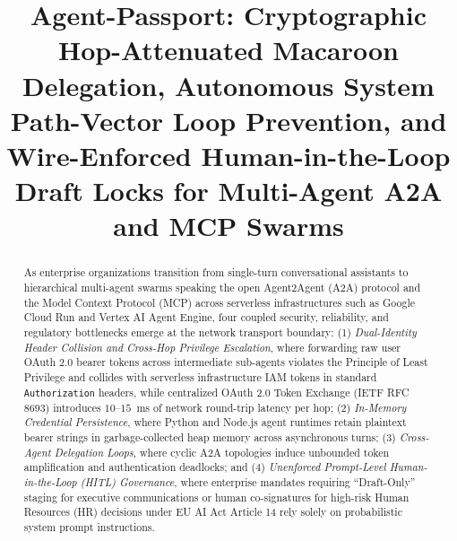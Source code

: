 \documentclass[conference,10pt]{IEEEtran}
\begin{document}
\title{Agent-Passport: Cryptographic Hop-Attenuated Macaroon Delegation, Autonomous System Path-Vector Loop Prevention, and Wire-Enforced Human-in-the-Loop Draft Locks for Multi-Agent A2A and MCP Swarms}

\author{
}

\maketitle

\begin{abstract}
As enterprise organizations transition from single-turn conversational assistants to hierarchical multi-agent swarms speaking the open Agent2Agent (A2A) protocol and the Model Context Protocol (MCP) across serverless infrastructures such as Google Cloud Run and Vertex AI Agent Engine, four coupled security, reliability, and regulatory bottlenecks emerge at the network transport boundary: (1) \emph{Dual-Identity Header Collision and Cross-Hop Privilege Escalation}, where forwarding raw user OAuth 2.0 bearer tokens across intermediate sub-agents violates the Principle of Least Privilege and collides with serverless infrastructure IAM tokens in standard \texttt{Authorization} headers, while centralized OAuth 2.0 Token Exchange (IETF RFC 8693) introduces $10\text{--}15$~ms of network round-trip latency per hop; (2) \emph{In-Memory Credential Persistence}, where Python and Node.js agent runtimes retain plaintext bearer strings in garbage-collected heap memory across asynchronous turns; (3) \emph{Cross-Agent Delegation Loops}, where cyclic A2A topologies induce unbounded token amplification and authentication deadlocks; and (4) \emph{Unenforced Prompt-Level Human-in-the-Loop (HITL) Governance}, where enterprise mandates requiring ``Draft-Only'' staging for executive communications or human co-signatures for high-risk Human Resources (HR) decisions under EU AI Act Article 14 rely solely on probabilistic system prompt instructions.


\end{abstract}
\end{document}
